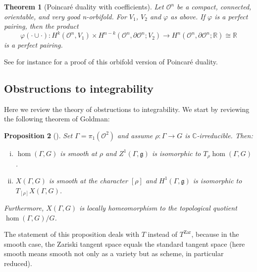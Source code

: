 \documentclass[a4paper,11pt]{article}
\newtheorem{Theorem}{Theorem}[section]
\newtheorem{Proposition}[Theorem]{Proposition}
\begin{document}
\begin{Theorem}[Poincar\'e duality with coefficients]
\label{TheoremPD}
 Let $\mathcal O^n$ be a  compact, connected, orientable, and very good n-orbifold.
 For $V_1$, $V_2$ and $\varphi$ as above. If $\varphi$ is a perfect pairing, then the product 
 $$ \varphi(\cdot\cup\cdot)\colon
 H^k(\mathcal O^n, V_1)\times 
 H^{n-k}(\mathcal O^n, \partial \mathcal O^n; V_2)\to 
 H^n(\mathcal O^n, \partial \mathcal O^n; \mathbb R)
 \cong\mathbb R
 $$
 is a perfect pairing.
\end{Theorem}

See for instance 
\cite[Proposition 3.4]{PortiDim}
for a proof of this orbifold version of Poincar\' e duality.





 


\subsection{Obstructions to integrability}
\label{Section:tangent}


Here we review the theory of obstructions to integrability. We start by reviewing the following theorem of Goldman:

\begin{Proposition}[\cite{Goldman}]
\label{Proposition:Goldman}
Set $\Gamma= \pi_1(\mathcal O^2)$ and
 assume $\rho\colon\Gamma\to G$ is $\mathbb C$-irreducible. Then:
 \begin{enumerate}[(i)]
  \item $\hom(\Gamma, G)$ is  smooth at $\rho$ and 
  $Z^1(\Gamma,\mathfrak g)$ is isomorphic to $T_\rho\hom(\Gamma, G)$.
  \item $X(\Gamma, G)$ is smooth at the character $[\rho]$ and 
  $H^1(\Gamma,\mathfrak g)$ is isomorphic to $T_{[\rho]} X(\Gamma, G)$.
 \end{enumerate}
 Furthermore, $X(\Gamma, G)$ is locally homeomorphism to the topological quotient  $\hom(\Gamma, G)/G$.
\end{Proposition}

The statement of this proposition deals with
$T$ instead of $T^{\mathrm{Zar}}$, because in the smooth case,
the Zariski tangent space equals the standard tangent space (here smooth means smooth 
not only as a variety but as scheme,
in particular reduced).
\end{document}
